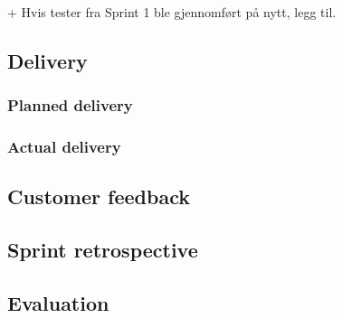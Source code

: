 + Hvis tester fra Sprint 1 ble gjennomført på nytt, legg til.

\subsection{Delivery}
\subsubsection{Planned delivery}
\subsubsection{Actual delivery}
\subsection{Customer feedback}
\subsection{Sprint retrospective}
\subsection{Evaluation}